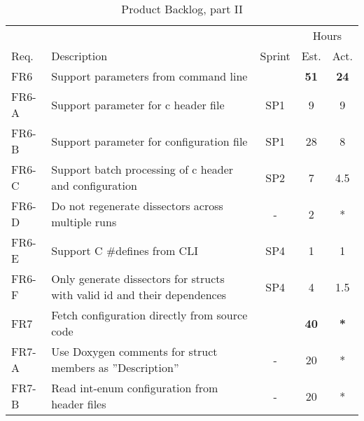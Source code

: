 \begin{table}[ht] \small \center
\caption{Product Backlog, part II \label{tab:prodbacklog2}}
\begin{tabularx}{\textwidth}{l X c c c}
	\toprule
	& & & \multicolumn{2}{c}{Hours} \\
	\cmidrule(r){4-5}
	Req. & Description & Sprint & Est. & Act. \\
	\midrule	
	FR6 & Support parameters from command line & & \textbf{51} & \textbf{24}\\
	FR6-A & Support parameter for \Gls{c} \gls{header} file & SP1 & 9 & 9 \\
	FR6-B & Support parameter for configuration file & SP1 & 28 & 8 \\
	FR6-C & Support batch processing of \Gls{c} \gls{header} and configuration & SP2 & 7 & 4.5 \\
	FR6-D & Do not regenerate dissectors across multiple runs & - & 2 & *\\
	FR6-E & Support C \#defines from CLI & SP4 & 1 & 1 \\
	FR6-F & Only generate dissectors for structs with valid id and their dependences & SP4 & 4 & 1.5\\
    \addlinespace
	FR7 & Fetch configuration directly from source code & & \textbf{40} &  \textbf{*} \\
	FR7-A & Use Doxygen comments for struct members as ''Description'' & - & 20 & *\\
	FR7-B & Read int-enum configuration from header files & - & 20 & * \\
	\bottomrule
\end{tabularx}
\end{table}








